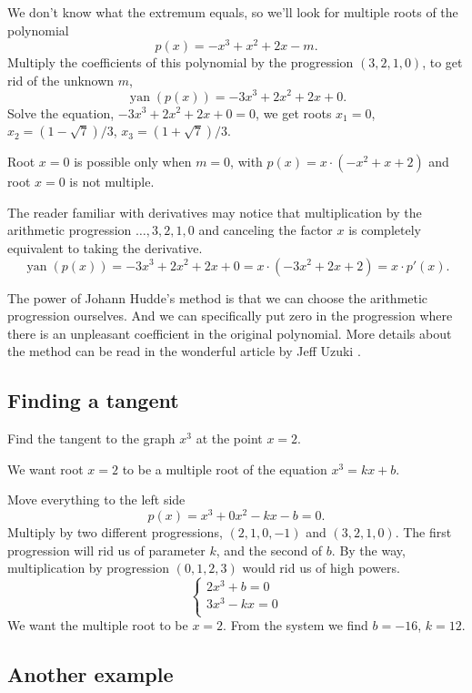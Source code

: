 \documentclass[12pt]{article}
\DeclareMathOperator{\yan}{yan}
\begin{document}
We don't know what the extremum equals, so we'll look for multiple roots of the polynomial 
\[
p(x) = -x^3 + x^2 + 2x - m.
\]
Multiply the coefficients of this polynomial by the progression $(3, 2, 1, 0)$, to get rid of the unknown $m$,
\[
\yan(p(x)) = -3x^3 + 2x^2 + 2x + 0.
\]
Solve the equation, $-3x^3 + 2x^2 + 2x + 0 = 0$, we get roots $x_1 = 0$,  $x_2 = (1 - \sqrt{7}) / 3$, $x_3 = (1 + \sqrt{7}) / 3$.

Root $x = 0$ is possible only when $m = 0$, with $p(x) = x\cdot (-x^2 + x + 2)$ and root $x = 0$ is not multiple. 

The reader familiar with derivatives may notice that multiplication by the arithmetic progression $\dots, 3, 2, 1, 0$ and canceling the factor $x$ is completely equivalent to taking the derivative. 
\[
\yan(p(x)) = -3x^3 + 2x^2 + 2x + 0 = x \cdot (-3x^2 + 2x + 2) = x \cdot p'(x).
\]

The power of Johann Hudde's method is that we can choose the arithmetic progression ourselves. 
And we can specifically put zero in the progression where there is an unpleasant coefficient in the original polynomial.
More details about the method can be read in the wonderful article by Jeff Uzuki \cite{uzuki2005lost}.

\subsection*{Finding a tangent}

Find the tangent to the graph $x^3$ at the point $x = 2$.

We want root $x = 2$ to be a multiple root of the equation $x^3 = kx + b$.

Move everything to the left side 
\[
p(x)  = x^3 + 0x^2 - kx - b = 0.
\]
Multiply by two different progressions, $(2, 1, 0, -1)$ and $(3, 2, 1, 0)$.
The first progression will rid us of parameter $k$, and the second of $b$.
By the way, multiplication by progression $(0, 1, 2, 3)$ would rid us of high powers.
\[
\begin{cases}
    2x^3 + b = 0 \\
    3x^3 - kx = 0 \\
\end{cases}
\]
We want the multiple root to be $x = 2$.
From the system we find $b = - 16$, $k = 12$.


\subsection*{Another example}
\end{document}
